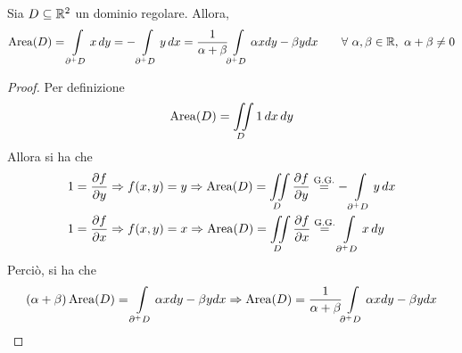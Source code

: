 \begin{corollary}
Sia $D \subseteq \mathbb{R}^2$ un dominio regolare. Allora,
\begin{equation}
    \operatorname{Area}(D)= \int\limits_{\partial^+ D}{x}\, dy = -\int\limits_{\partial^+ D}{y}\, dx = \frac{1}{\alpha+\beta}{\int\limits_{\partial^+ D}{\alpha x dy - \beta y dx}} \qquad \forall\ \alpha, \beta \in \mathbb{R},\ \alpha+\beta \neq 0
\end{equation}
\end{corollary}
\begin{proof}
    Per definizione 
    \begin{equation}
        \operatorname{Area}(D)= \iint\limits_{D}{1}\,dx\, dy
    \end{equation}
    Allora si ha che
    \begin{align}
        &1= \frac{\partial f}{\partial y} \Rightarrow f(x,y)= y \Rightarrow \operatorname{Area}(D)= \iint\limits_{D} \frac{\partial f}{\partial y} \overset{\text{G.G.}}{=}  -\int\limits_{\partial^+ D}{y}\,dx\\
      &  1=\frac{\partial f}{\partial x} \Rightarrow f(x,y)= x \Rightarrow \operatorname{Area}(D)= \iint\limits_{D} \frac{\partial f}{\partial x} \overset{\text{G.G.}}{=}  \int\limits_{\partial^+ D}{x}\,dy
    \end{align}
    Perciò, si ha che
    \begin{equation}
        (\alpha+\beta)\operatorname{Area}(D)= \int\limits_{\partial^+ D}{\alpha x dy - \beta y dx} \Rightarrow \operatorname{Area}(D)=  \frac{1}{\alpha+\beta}{\int\limits_{\partial^+ D}{\alpha x dy - \beta y dx}}
    \end{equation}
\end{proof}
